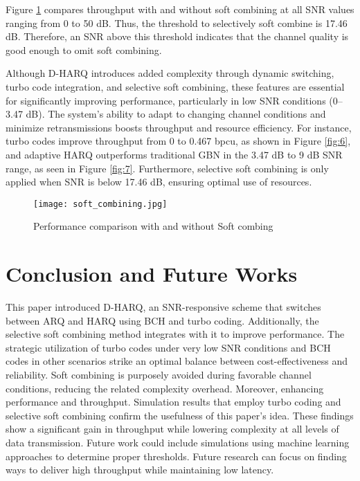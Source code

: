 \documentclass[sn-mathphys-num]{sn-jnl}
\theoremstyle{thmstyleone}
\theoremstyle{thmstyletwo}%
\theoremstyle{thmstylethree}%
\begin{document}
Figure \ref{fig:9} compares throughput with and without soft combining at all SNR values ranging from 0 to 50 dB. Thus, the threshold to selectively soft combine is 17.46 dB. Therefore, an SNR above this threshold indicates that the channel quality is good enough to omit soft combining.

Although D-HARQ introduces added complexity through dynamic switching, turbo code integration, and selective soft combining, these features are essential for significantly improving performance, particularly in low SNR conditions (0–3.47 dB). The system’s ability to adapt to changing channel conditions and minimize retransmissions boosts throughput and resource efficiency.  For instance, turbo codes improve throughput from 0 to 0.467 bpcu, as shown in Figure \ref{fig:6}, and adaptive HARQ outperforms traditional GBN in the 3.47 dB to 9 dB SNR range, as seen in Figure \ref{fig:7}. Furthermore, selective soft combining is only applied when SNR is below 17.46 dB, ensuring optimal use of resources.

\begin{figure}[H]
    \centering
    \texttt{[image: soft\_combining.jpg]}
    \caption{Performance comparison with and without Soft combing}
    \label{fig:9}
\end{figure}


\section{Conclusion and Future Works} \label{s5}

This paper introduced D-HARQ, an SNR-responsive scheme that switches between ARQ and HARQ using BCH and turbo coding. Additionally, the selective soft combining method integrates with it to improve performance. The strategic utilization of turbo codes under very low SNR conditions and BCH codes in other scenarios strike an optimal balance between cost-effectiveness and reliability. Soft combining is purposely avoided during favorable channel conditions, reducing the related complexity overhead. Moreover, enhancing performance and throughput. Simulation results that employ turbo coding and selective soft combining confirm the usefulness of this paper's idea. These findings show a significant gain in throughput while lowering complexity at all levels of data transmission. Future work could include simulations using machine learning approaches to determine proper thresholds. Future research can focus on finding ways to deliver high throughput while maintaining low latency. 
\end{document}
